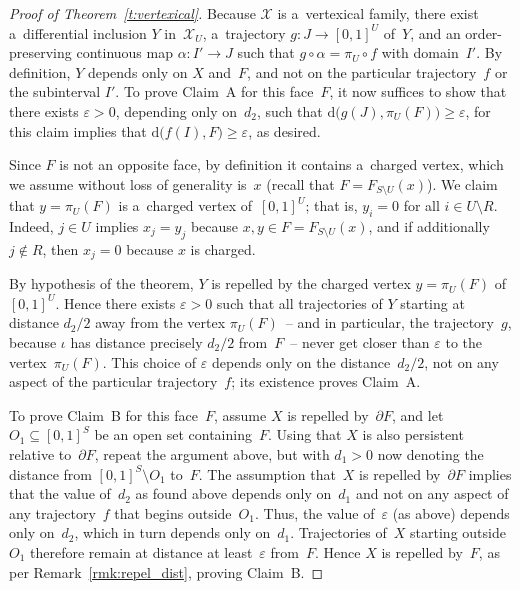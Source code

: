 \documentclass[11pt]{article}
\begin{document}
\begin{proof}[Proof of Theorem~\ref{t:vertexical}]
Because $\mathcal X$ is a~vertexical family, there exist a~dif\/ferential inclusion $Y$ in~$\mathcal X_U$, a~trajectory
$g:J\to[0,1]^U$ of~$Y$, and an order-preserving continuous map $\alpha:I'\to J$ such that $g\circ\alpha=\pi_U\circ f$
with domain~$I'$.
By def\/inition, $Y$ depends only on $X$ and~$F$, and not on the particular trajectory~$f$ or the subinterval $I'$.
To prove Claim~A for this face~$F$, it now suf\/f\/ices to show that there exists $\varepsilon>0$, depending only
on~$d_2$, such that $\mathrm{d}\big(g(J),\pi_U(F)\big)\geq\varepsilon$, for this claim implies that
$\mathrm{d}\big(f(I),F\big)\geq\varepsilon$, as desired.

Since $F$ is not an opposite face, by def\/inition it contains a~charged vertex, which we assume without loss of
generality is~$x$ (recall that $F=F_{S\setminus U}(x)$).
We claim that $y=\pi_U(F)$ is a~charged vertex of~$[0,1]^U$; that is, $y_i=0$ for all $i\in U\setminus R$.
Indeed, $j\in U$ implies $x_j=y_j$ because $x,y\in F=F_{S\setminus U}(x)$, and if additionally $j\notin R$, then
$x_j=0$ because $x$ is charged.

By hypothesis of the theorem, $Y$ is repelled by the charged vertex $y=\pi_U(F)$ of~$[0,1]^U$.
Hence there exists $\varepsilon>0$ such that all trajectories of $Y$ starting at distance $d_2/2$ away from the vertex
$\pi_U(F)$~-- and in particular, the trajectory~$g$, because $\iota$ has distance precisely $d_2/2$ from~$F$~-- never get
closer than $\varepsilon$ to the vertex~$\pi_U(F)$.
This choice of $\varepsilon$ depends only on the distance~$d_2/2$, not on any aspect of the particular trajectory~$f$;
its existence proves Claim~A.

To prove Claim~B for this face~$F$, assume $X$ is repelled by~$\partial F$, and let $O_1\subseteq[0,1]^S$ be an open
set containing~$F$.
Using that $X$ is also persistent relative to~$\partial F$, repeat the argument above, but with $d_1>0$ now denoting
the distance from $[0,1]^S\setminus O_1$ to~$F$.
The assumption that~$X$ is repelled by~$\partial F$ implies that the value of~$d_2$ as found above depends only
on~$d_1$ and not on any aspect of any trajectory~$f$ that begins outside~$O_1$.
Thus, the value of~$\varepsilon$ (as above) depends only on~$d_2$, which in turn depends only on~$d_1$.
Trajectories of~$X$ starting outside~$O_1$ therefore remain at distance at least~$\varepsilon$ from~$F$.
Hence $X$ is repelled by~$F$, as per Remark~\ref{rmk:repel_dist}, proving Claim~B.
\end{proof}
\end{document}
